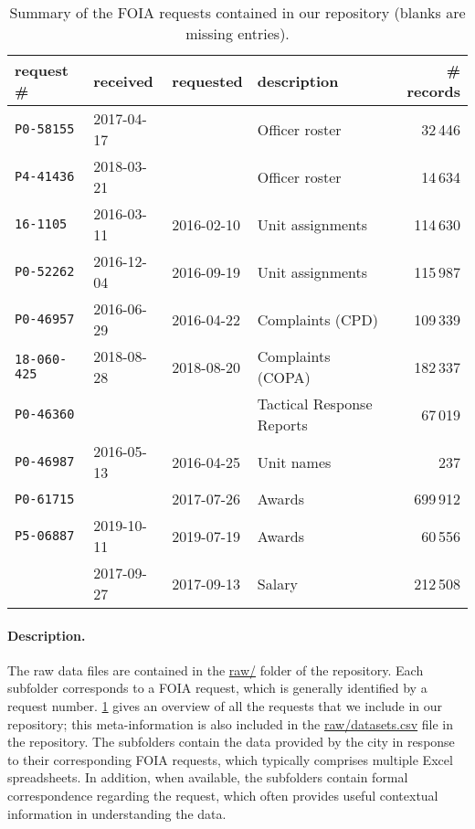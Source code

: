 \begin{table}[h]
	\begin{center}
\caption{Summary of the FOIA requests contained in our repository (blanks are missing entries).}
\label{table:summary}
\begin{tabular}{@{}llllr@{}}
	\toprule
	request \#&received&requested&description& \# records\\
\midrule
	\texttt{P0-58155}&2017-04-17& &Officer roster& 32\,446\\
	\texttt{P4-41436}&2018-03-21& &Officer roster& 14\,634\\
	\texttt{16-1105}&2016-03-11&2016-02-10&Unit assignments&114\,630\\
	\texttt{P0-52262}&2016-12-04&2016-09-19&Unit assignments&115\,987\\
	\texttt{P0-46957}&2016-06-29&2016-04-22&Complaints (CPD)&109\,339\\
	\texttt{18-060-425}&2018-08-28&2018-08-20&Complaints (COPA)&182\,337\\
	\texttt{P0-46360}& & &Tactical Response Reports&67\,019\\
	\texttt{P0-46987}&2016-05-13&2016-04-25&Unit names&237\\
	\texttt{P0-61715}& &2017-07-26&Awards&699\,912\\
	\texttt{P5-06887}&2019-10-11&2019-07-19&Awards&60\,556\\
					 &2017-09-27&2017-09-13&Salary&212\,508\\
\bottomrule
\end{tabular}
\end{center}
\end{table}

\paragraph{Description.}
The raw data files are contained in the \url{raw/} folder of the
repository. Each subfolder corresponds to a FOIA request, which is
generally identified by a request number. \cref{table:summary} gives
an overview of all the requests that we include in
our repository; this meta-information is also included in the \url{raw/datasets.csv}
file in the repository. The subfolders contain the data provided by the city
in response to their corresponding FOIA requests, which typically comprises multiple
Excel spreadsheets. In addition, when available, the subfolders contain formal correspondence 
regarding the request, which often provides useful contextual information in understanding the data.  

